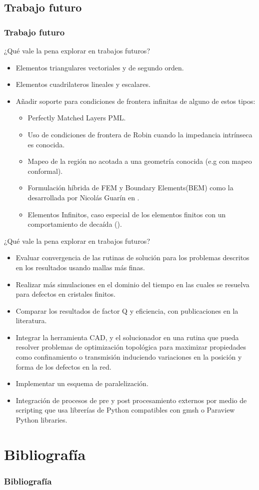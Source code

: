 \documentclass[xcolor=table,serif]{beamer}
\begin{document}
	\subsection{Trabajo futuro}
	\begin{frame}
		\frametitle{Trabajo futuro}
		¿Qué vale la pena explorar en trabajos futuros?		
		\begin{itemize}
		\pause
		\item Elementos triangulares vectoriales y de segundo orden.
		\pause		
		\item  Elementos cuadrilateros lineales y escalares.
		\pause
		\item Añadir soporte para condiciones de frontera infinitas de alguno de estos tipos:
		\begin{itemize}
			\pause
			\item  Perfectly Matched Layers PML\cite{Jin2010}. 
			\pause
			\item Uso de condiciones de frontera de Robin cuando la impedancia intrínseca es conocida.
			\pause
			\item Mapeo  de la región no acotada a una geometría conocida (e.g con mapeo conformal). \pause
		\item Formulación híbrida de  FEM y Boundary Elements(BEM) como la desarrollada por Nicol\'as Guar\'in en \cite{Guarin2012}.
		\pause
		\item Elementos Infinitos, caso especial de los elementos finitos con un comportamiento de decaída (\cite{Zienkiewicz2005}).
		\end{itemize} 
	\end{itemize}
	\end{frame}
	\begin{frame}
	¿Qué vale la pena explorar en trabajos futuros?
		\begin{itemize}
		\pause
		\item Evaluar convergencia de las rutinas de solución para los problemas descritos en los resultados usando mallas más finas.
		\pause
		\item Realizar más simulaciones en el dominio del tiempo en las cuales se resuelva para defectos en cristales finitos.
		\pause
		\item Comparar los resultados de factor Q y eficiencia, con publicaciones en la literatura.
		\pause
		\item Integrar la herramienta CAD, y el solucionador en una rutina que pueda resolver problemas de optimización topológica para maximizar propiedades como confinamiento o transmisión induciendo variaciones en la posición y forma de los defectos en la red.
		\pause
		\item Implementar un esquema de paralelización.
		\pause
		\item Integración de procesos de pre y post procesamiento externos por medio de scripting que usa librerías de Python compatibles con gmsh o Paraview Python libraries.
		\end{itemize}
	\end{frame}

\section{Bibliograf\'ia}
  \begin{frame}[allowframebreaks]
  \frametitle{Bibliograf\'ia}
  
  
  \end{frame}
\end{document}
